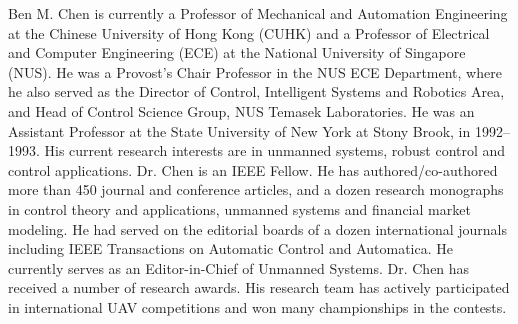 \documentclass[journal]{IEEEtran}
\begin{document}
\begin{IEEEbiography}{Ben M. Chen} is currently a Professor of Mechanical and Automation Engineering at the Chinese University of Hong Kong (CUHK) and a Professor of Electrical and Computer Engineering (ECE) at the National University of Singapore (NUS). He was a Provost's Chair Professor in the NUS ECE Department, where he also served as the Director of Control, Intelligent Systems and Robotics Area, and Head of Control Science Group, NUS Temasek Laboratories. He was an Assistant Professor at the State University of New York at Stony Brook, in 1992–1993. His current research interests are in unmanned systems, robust control and control applications. 
Dr. Chen is an IEEE Fellow. He has authored/co-authored more than 450 journal and conference articles, and a dozen research monographs in control theory and applications, unmanned systems and financial market modeling. He had served on the editorial boards of a dozen international journals including IEEE Transactions on Automatic Control and Automatica. He currently serves as an Editor-in-Chief of Unmanned Systems. Dr. Chen has received a number of research awards. His research team has actively participated in international UAV competitions and won many championships in the contests.

\end{IEEEbiography}
\end{document}
